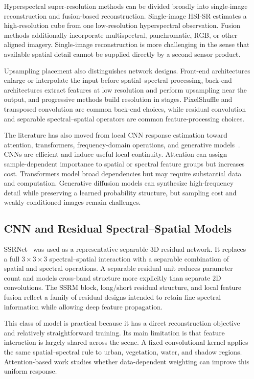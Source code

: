 \documentclass[10pt,twocolumn,letterpaper]{article}
\begin{document}
Hyperspectral super-resolution methods can be divided broadly into single-image reconstruction and fusion-based reconstruction. Single-image HSI-SR estimates a high-resolution cube from one low-resolution hyperspectral observation. Fusion methods additionally incorporate multispectral, panchromatic, RGB, or other aligned imagery. Single-image reconstruction is more challenging in the sense that available spatial detail cannot be supplied directly by a second sensor product.

Upsampling placement also distinguishes network designs. Front-end architectures enlarge or interpolate the input before spatial--spectral processing, back-end architectures extract features at low resolution and perform upsampling near the output, and progressive methods build resolution in stages. PixelShuffle and transposed convolution are common back-end choices, while residual convolution and separable spectral--spatial operators are common feature-processing choices.

The literature has also moved from local CNN response estimation toward attention, transformers, frequency-domain operations, and generative models~\cite{wang2023survey}. CNNs are efficient and induce useful local continuity. Attention can assign sample-dependent importance to spatial or spectral feature groups but increases cost. Transformers model broad dependencies but may require substantial data and computation. Generative diffusion models can synthesize high-frequency detail while preserving a learned probability structure, but sampling cost and weakly conditioned images remain challenges.

\subsection{CNN and Residual Spectral--Spatial Models}

SSRNet~\cite{wang2020ssrnet} was used as a representative separable 3D residual network. It replaces a full $3\times3\times3$ spectral--spatial interaction with a separable combination of spatial and spectral operations. A separable residual unit reduces parameter count and models cross-band structure more explicitly than separate 2D convolutions. The SSRM block, long/short residual structure, and local feature fusion reflect a family of residual designs intended to retain fine spectral information while allowing deep feature propagation.

This class of model is practical because it has a direct reconstruction objective and relatively straightforward training. Its main limitation is that feature interaction is largely shared across the scene. A fixed convolutional kernel applies the same spatial--spectral rule to urban, vegetation, water, and shadow regions. Attention-based work studies whether data-dependent weighting can improve this uniform response.
\end{document}
